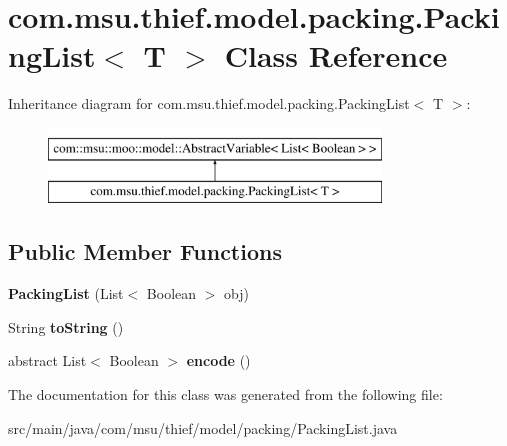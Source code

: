 \hypertarget{classcom_1_1msu_1_1thief_1_1model_1_1packing_1_1PackingList_3_01T_01_4}{\section{com.\-msu.\-thief.\-model.\-packing.\-Packing\-List$<$ T $>$ Class Reference}
\label{classcom_1_1msu_1_1thief_1_1model_1_1packing_1_1PackingList_3_01T_01_4}
}
Inheritance diagram for com.\-msu.\-thief.\-model.\-packing.\-Packing\-List$<$ T $>$\-:\begin{figure}[H]
\begin{center}
\leavevmode
\includegraphics[height=2.000000cm]{classcom_1_1msu_1_1thief_1_1model_1_1packing_1_1PackingList_3_01T_01_4}
\end{center}
\end{figure}
\subsection*{Public Member Functions}
\begin{DoxyCompactItemize}
\item 
\hypertarget{classcom_1_1msu_1_1thief_1_1model_1_1packing_1_1PackingList_3_01T_01_4_a033c53747cd5c19ac7753980f22adb76}{{\bfseries Packing\-List} (List$<$ Boolean $>$ obj)}\label{classcom_1_1msu_1_1thief_1_1model_1_1packing_1_1PackingList_3_01T_01_4_a033c53747cd5c19ac7753980f22adb76}

\item 
\hypertarget{classcom_1_1msu_1_1thief_1_1model_1_1packing_1_1PackingList_3_01T_01_4_afa71557bc36cdb0c05e858841c49c13e}{String {\bfseries to\-String} ()}\label{classcom_1_1msu_1_1thief_1_1model_1_1packing_1_1PackingList_3_01T_01_4_afa71557bc36cdb0c05e858841c49c13e}

\item 
\hypertarget{classcom_1_1msu_1_1thief_1_1model_1_1packing_1_1PackingList_3_01T_01_4_abee72a5b03d4d5fa840e96ce6a162d30}{abstract List$<$ Boolean $>$ {\bfseries encode} ()}\label{classcom_1_1msu_1_1thief_1_1model_1_1packing_1_1PackingList_3_01T_01_4_abee72a5b03d4d5fa840e96ce6a162d30}

\end{DoxyCompactItemize}


The documentation for this class was generated from the following file\-:\begin{DoxyCompactItemize}
\item 
src/main/java/com/msu/thief/model/packing/Packing\-List.\-java\end{DoxyCompactItemize}
